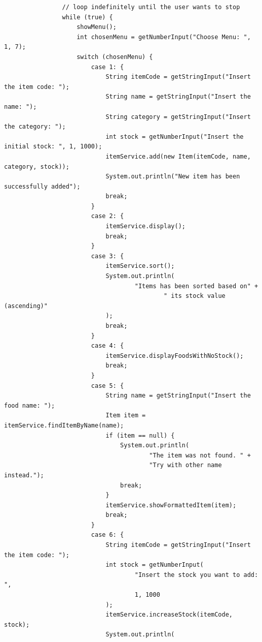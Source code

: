 \documentclass[12pt,titlepage]{article}
\begin{document}
\begin{enumerate}
{\begin{verbatim}
                // loop indefinitely until the user wants to stop
                while (true) {
                    showMenu();
                    int chosenMenu = getNumberInput("Choose Menu: ", 1, 7);
                    switch (chosenMenu) {
                        case 1: {
                            String itemCode = getStringInput("Insert the item code: ");
                            String name = getStringInput("Insert the name: ");
                            String category = getStringInput("Insert the category: ");
                            int stock = getNumberInput("Insert the initial stock: ", 1, 1000);
                            itemService.add(new Item(itemCode, name, category, stock));
                            System.out.println("New item has been successfully added");
                            break;
                        }
                        case 2: {
                            itemService.display();
                            break;
                        }
                        case 3: {
                            itemService.sort();
                            System.out.println(
                                    "Items has been sorted based on" +
                                            " its stock value (ascending)"
                            );
                            break;
                        }
                        case 4: {
                            itemService.displayFoodsWithNoStock();
                            break;
                        }
                        case 5: {
                            String name = getStringInput("Insert the food name: ");
                            Item item = itemService.findItemByName(name);
                            if (item == null) {
                                System.out.println(
                                        "The item was not found. " +
                                        "Try with other name instead.");
                                break;
                            }
                            itemService.showFormattedItem(item);
                            break;
                        }
                        case 6: {
                            String itemCode = getStringInput("Insert the item code: ");
                            int stock = getNumberInput(
                                    "Insert the stock you want to add: ", 
                                    1, 1000
                            );
                            itemService.increaseStock(itemCode, stock);
                            System.out.println(

\end{verbatim}}
\end{enumerate}
\end{document}
